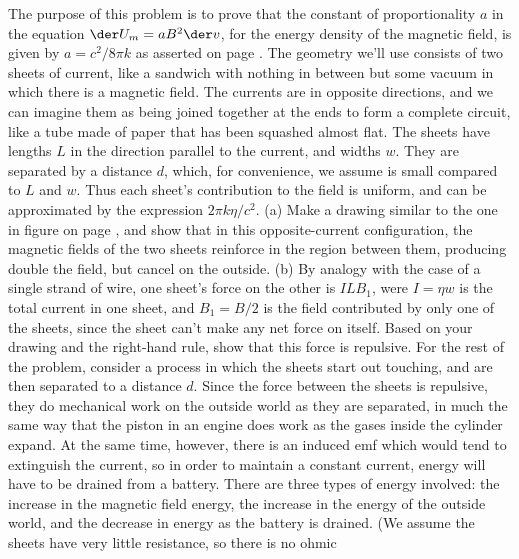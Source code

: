         The purpose of this problem is to prove that the constant of proportionality $a$
        in the equation $\der U_m=aB^2 \der v$, for the energy density of the magnetic field,
        is given by $a=c^2/8\pi k$  as asserted
        on page \pageref{benergy}.
        The geometry we'll use consists of two sheets of current, like a sandwich with
        nothing in between but some vacuum in which there is a magnetic field.
        The currents are in opposite directions, and we can imagine them as being
        joined together at the ends to form a complete circuit, like a tube made of
        paper that has been squashed almost flat. The sheets have lengths $L$ in the
        direction parallel to the current, and widths $w$. They are separated by
        a distance $d$, which, for convenience, we assume is small compared to $L$
        and $w$. Thus each sheet's contribution to the
        field is uniform, and can be approximated by the expression $2\pi k\eta/c^2$.\hwendpart
        (a) Make a drawing similar to the one in figure  on page
        \pageref{fig:ebsheet}, and show that in this opposite-current configuration,
        the magnetic fields of the two sheets reinforce in the region between them, 
        producing double the field, but cancel on the outside.\hwendpart
        (b) By analogy with the case of a single strand of wire,
        one sheet's force on the other is $ILB_1$, were $I=\eta w$ is the
        total current in one sheet, and $B_1=B/2$ is the field contributed by only one of the
        sheets, since the sheet can't make any net force on itself.
        Based on your drawing and the right-hand rule, show that this force is repulsive.\hwendpart
        For the rest of the problem, consider a process in which
        the sheets start out touching, and are then separated to a distance $d$. Since
        the force between the sheets is repulsive, they do mechanical work on the
        outside world as they are separated, in much the same way that the piston in an
        engine does work as the gases inside the cylinder expand. At the same time,
        however, there is an induced emf which would tend to extinguish the current,
        so in order to maintain a constant current, energy will have to be drained from
        a battery. There are three
        types of energy involved: the increase in the magnetic field energy, the increase
        in the energy of the outside world, and the decrease in energy as the battery is
        drained. (We assume the sheets have very little resistance, so there is no ohmic
